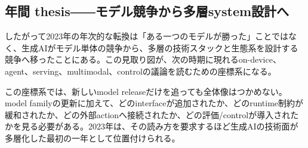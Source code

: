 \subsection{年間 thesis――モデル競争から多層system設計へ}

したがって2023年の年次的な転換は「ある一つのモデルが勝った」ことではなく、生成AIがモデル単体の競争から、多層の技術スタックと生態系を設計する競争へ移ったことにある。この見取り図が、次の時期に現れるon-device、agent、serving、multimodal、controlの議論を読むための座標系になる。


この座標系では、新しいmodel releaseだけを追っても全体像はつかめない。model familyの更新に加えて、どのinterfaceが追加されたか、どのruntime制約が緩和されたか、どの外部actionへ接続されたか、どの評価/controlが導入されたかを見る必要がある。2023年は、その読み方を要求するほど生成AIの技術面が多層化した最初の一年として位置付けられる。
